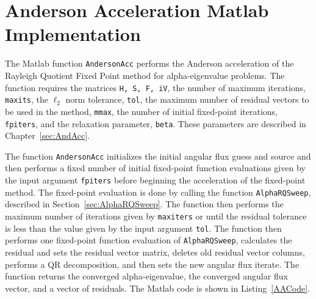 \clearpage

\section{Anderson Acceleration Matlab Implementation}

The Matlab function \texttt{AndersonAcc} performs the Anderson acceleration of the Rayleigh Quotient Fixed Point method for alpha-eigenvalue problems. The function requires the matrices \texttt{H, S, F, iV}, the number of maximum iterations, \texttt{maxits}, the $\ell_{2}$ norm tolerance, \texttt{tol}, the maximum number of residual vectors to be used in the method, \texttt{mmax}, the number of initial fixed-point iterations, \texttt{fpiters}, and the relaxation parameter, \texttt{beta}. These parameters are described in Chapter~\ref{sec:AndAcc}.

The function \texttt{AndersonAcc} initializes the initial angular flux guess and source and then performs a fixed number of initial fixed-point function evaluations given by the input argument \texttt{fpiters} before beginning the acceleration of the fixed-point method. The fixed-point evaluation is done by calling the function \texttt{AlphaRQSweep}, described in Section~\ref{sec:AlphaRQSweep}. The function then performs the maximum number of iterations given by \texttt{maxiters} or until the residual tolerance is less than the value given by the input argument \texttt{tol}. The function then performs one fixed-point function evaluation of \texttt{AlphaRQSweep}, calculates the residual and sets the residual vector matrix, deletes old residual vector columns, performs a QR decomposition, and then sets the new angular flux iterate. The function returns the converged alpha-eigenvalue, the converged angular flux vector, and a vector of residuals. The Matlab code is shown in Listing~\ref{AACode}.

